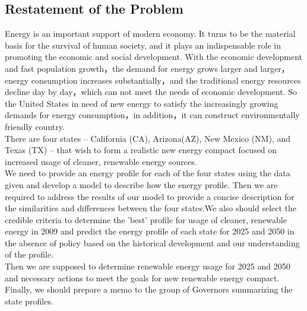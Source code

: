 \documentclass{mcmthesis}
\begin{document}
\subsection{Restatement of the Problem}
Energy is an important support of modern economy. It turns to be the material basis for the survival of human society, and it plays an indispensable role in promoting the economic and social development.\cite{energy} 
With the economic development and fast population growth，the demand for energy grows larger and larger，energy consumption increases substantially，and the traditional energy resources decline day by day，which can not meet the needs of economic development. So the United States in need of new energy to satisfy the increasingly growing demands for energy consumption，in addition，it can construct environmentally friendly country. \\
There are four states – California (CA), Arizona(AZ), New Mexico (NM), and Texas (TX) – that wish to form a realistic new energy compact focused on increased usage of cleaner, renewable energy sources. \\
We need to provide an energy profile for each of the four states using the data given and develop a model to describe how the energy profile. Then we are required to address the results of our model to provide a concise description for the similarities and differences between the four states.We also should select the credible criteria to determine the 'best' profile for usage of cleaner, renewable energy in 2009 and predict the energy profile of each state for 2025 and 2050 in the absence of policy based on the historical development and our understanding of the profile.\\
Then we are supposed to determine renewable energy usage for 2025 and 2050 and necessary actions to meet the goals for new renewable energy compact. Finally, we should prepare a memo to the group of Governors summarizing the state profiles.
\end{document}
